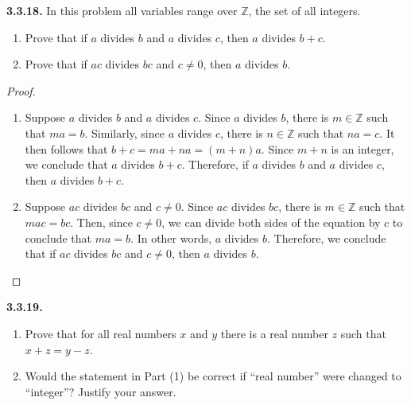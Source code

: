 \documentclass[12pt]{amsart}
\newenvironment{statement}[1]{\smallskip\noindent\color[rgb]{.6627, .3529, .6314} {\bf #1.}}{}
\theoremstyle{definition}
\theoremstyle{remark}
\newcommand{\BZ}{\mathbb Z}
\begin{document}
\begin{statement}{3.3.18}
In this problem all variables range over $\BZ$, the set of all integers.
\begin{enumerate}
	\item Prove that if $a$ divides $b$ and $a$ divides $c$, then $a$ divides $b + c$.
	
	\item Prove that if $ac$ divides $bc$ and $c \neq 0$, then $a$ divides $b$.
\end{enumerate}
\end{statement}

\begin{proof}
\hfill
\begin{enumerate}
	\item Suppose $a$ divides $b$ and $a$ divides $c$.
	Since $a$ divides $b$, there is $m \in \BZ$ such that $ma = b$.
	Similarly, since $a$ divides $c$, there is $n \in \BZ$ such that $na = c$.
	It then follows that $b + c = ma + na = (m + n)a$.
	Since $m + n$ is an integer, we conclude that $a$ divides $b + c$.
	Therefore, if $a$ divides $b$ and $a$ divides $c$, then $a$ divides $b + c$.
	
	\item Suppose $ac$ divides $bc$ and $c \neq 0$.
	Since $ac$ divides $bc$, there is $m \in \BZ$ such that $mac = bc$.
	Then, since $c \neq 0$, we can divide both sides of the equation 
	by $c$ to conclude that $ma = b$.
	In other words, $a$ divides $b$.
	Therefore, we conclude that if $ac$ divides $bc$ and $c \neq 0$, then $a$ divides $b$.
\end{enumerate}
\end{proof}


\begin{statement}{3.3.19}
\begin{enumerate}
	\item Prove that for all real numbers $x$ and $y$ there is a real number $z$ such that
	$x + z = y - z$.
	
	\item Would the statement in Part (1) be correct if ``real number'' were changed to ``integer''?
	Justify your answer.
\end{enumerate}
\end{statement}
\end{document}
